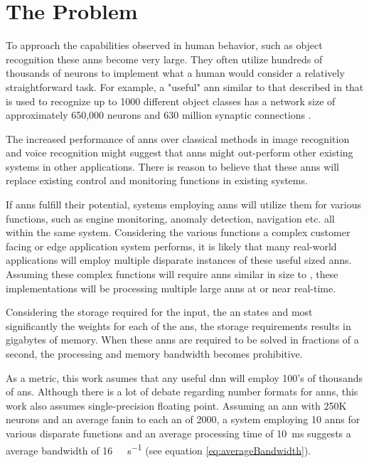 \section[The Problem]{The Problem}
\label{sec:The Problem}

To approach the capabilities observed in human behavior, such as object recognition these \ac{ann}s become very large.
They often utilize hundreds of thousands of neurons to implement what a human would consider a relatively straightforward task.
For example, a "useful" \ac{ann} similar to that described in \cite{krizhevsky2012imagenet} that is used to recognize up to 1000 different object classes has a network size of approximately 650,000 neurons and 630 million synaptic connections \cite{krizhevsky2012imagenetPreso}. 

The increased performance of \ac{ann}s over classical methods in image recognition and voice recognition might suggest that \ac{ann}s might out-perform other existing systems in other applications.
There is reason to believe that these \ac{ann}s will replace existing control and monitoring functions in existing systems.

If \ac{ann}s fulfill their potential, systems employing \ac{ann}s will utilize them for various functions, such as engine monitoring, anomaly detection, navigation etc. all within the same system.
Considering the various functions a complex customer facing or edge application system performs, it is likely that many real-world applications will employ multiple disparate instances of these useful sized \ac{ann}s.
Assuming these complex functions will require \ac{ann}s similar in size to \cite{krizhevsky2012imagenet}, these implementations will be processing multiple large \ac{ann}s at or near real-time.

Considering the storage required for the input, the \ac{an} states and most significantly the weights for each of the \ac{an}s, the storage requirements results in gigabytes of memory.
When these \ac{ann}s are required to be solved in fractions of a second, the processing and memory bandwidth becomes prohibitive.

As a metric, this work asumes that any useful \ac{dnn} will employ 100's of thousands of \ac{an}s. Although there is a lot of debate regarding number formats for \ac{ann}s, this work also assumes single-precision floating point.
Assuming an \ac{ann} with 250K neurons and an average fanin to each \ac{an} of 2000, a system employing 10 \ac{ann}s for various disparate functions and an average processing time of \SI{10}{\milli\second} suggests a average bandwidth of \SI[per-mode=symbol]{16}{\tera \bit \per \second} (see equation \ref{eq:averageBandwidth}).

